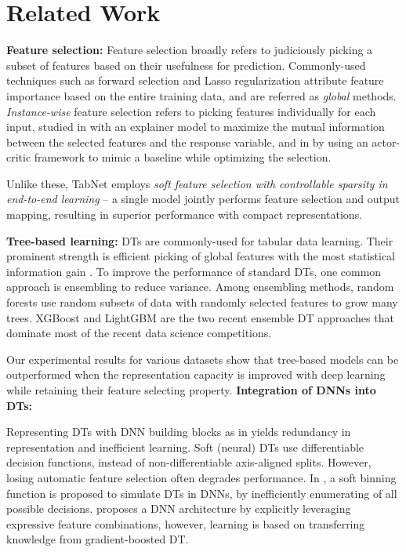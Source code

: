 \section{Related Work}

{\bf Feature selection:} Feature selection broadly refers to judiciously picking a subset of features based on their usefulness for prediction. Commonly-used techniques such as forward selection and Lasso regularization \citep{feature_selection} attribute feature importance based on the entire training data, and are referred as \emph{global} methods. 
\emph{Instance-wise} feature selection refers to picking features individually for each input, studied in \citep{l2x} with an explainer model to maximize the mutual information between the selected features and the response variable, and in \citep{invase} by using an actor-critic framework to mimic a baseline while optimizing the selection. 

Unlike these, TabNet employs \emph{soft feature selection with controllable sparsity in end-to-end learning} -- a single model jointly performs feature selection and output mapping, resulting in superior performance with compact representations.

{\bf Tree-based learning:} DTs are commonly-used for tabular data learning. Their prominent strength is efficient picking of global features with the most statistical information gain \citep{decisiontree1}. To improve the performance of standard DTs, one common approach is ensembling to reduce variance. Among ensembling methods, random forests \citep{random_forest} use random subsets of data with randomly selected features to grow many trees. XGBoost \citep{XGBoost} and LightGBM \citep{lightgbm} are the two recent ensemble DT approaches that dominate most of the recent data science competitions. 

Our experimental results for various datasets show that tree-based models can be outperformed when the representation capacity is improved with deep learning while retaining their feature selecting property.
{\bf Integration of DNNs into DTs:} 

Representing DTs with DNN building blocks as in \citep{DNN_init_tree} yields redundancy in representation and inefficient learning. Soft (neural) DTs \citep{neural_randomforest,neural_decisionforest} use differentiable decision functions, instead of non-differentiable axis-aligned splits. However, losing automatic feature selection often degrades performance. In \citep{dndt}, a soft binning function is proposed to simulate DTs in DNNs, by inefficiently enumerating of all possible decisions. \citep{tabnn} proposes a DNN architecture by explicitly leveraging expressive feature combinations, however, learning is based on transferring knowledge from gradient-boosted DT.

